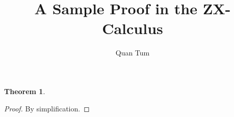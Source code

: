 \documentclass{article}
\title{A Sample Proof in the ZX-Calculus}
\author{Quan Tum}
\newtheorem{theorem}{Theorem}
\begin{document}
\maketitle

\begin{theorem}
\end{theorem}

\begin{proof}
  By simplification.
\end{proof}
\end{document}
